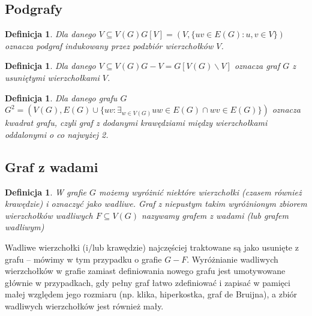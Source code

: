 \documentclass{pracamgr}
\newtheorem{defi}[theorem]{Definicja}
\begin{document}
   \subsection{Podgrafy}
    \begin{defi}\label{podgraf indukowany}
     Dla danego $V\subseteq V(G)$\quad $G[V]=(V,\{uv\in E(G):u,v\in V\})$ oznacza \emph{podgraf indukowany} przez podzbiór wierzchołków $V$.
    \end{defi}
    \begin{defi}\label{roznica grafow}
     Dla danego $V\subseteq V(G)$\quad $G-V=G[V(G)\backslash V]$ oznacza \emph{graf $G$ z usuniętymi wierzchołkami $V$}.
    \end{defi}
    \begin{defi}\label{kwadrat grafu}
     Dla danego grafu $G$\newline $G^2=(V(G),E(G)\cup\{uv:\exists_{w\in V(G)}uw\in E(G)\cap wv\in E(G)\})$
     oznacza \emph{kwadrat grafu}, czyli graf z dodanymi krawędziami między wierzchołkami oddalonymi o co najwyżej 2.
    \end{defi}
   \subsection{Graf z wadami}
    \begin{defi}\label{graf z wadami}
     W grafie $G$ możemy wyróżnić niektóre wierzchołki (czasem również krawędzie) i oznaczyć jako wadliwe.
     Graf z niepustym takim wyróżnionym zbiorem wierzchołków wadliwych $F\subseteq V(G)$ nazywamy \emph{grafem z wadami} (lub \emph{grafem wadliwym})
    \end{defi}
    Wadliwe wierzchołki (i/lub krawędzie) najczęściej traktowane są jako usunięte z grafu -- mówimy w tym przypadku o grafie $G-F$.
    Wyróżnianie wadliwych wierzchołków w grafie zamiast definiowania nowego grafu jest umotywowane głównie w przypadkach,
    gdy pełny graf łatwo zdefiniować i zapisać w pamięci małej względem jego rozmiaru (np. klika, hiperkostka, graf de Bruijna),
    a zbiór wadliwych wierzchołków jest również mały.%
\end{document}
